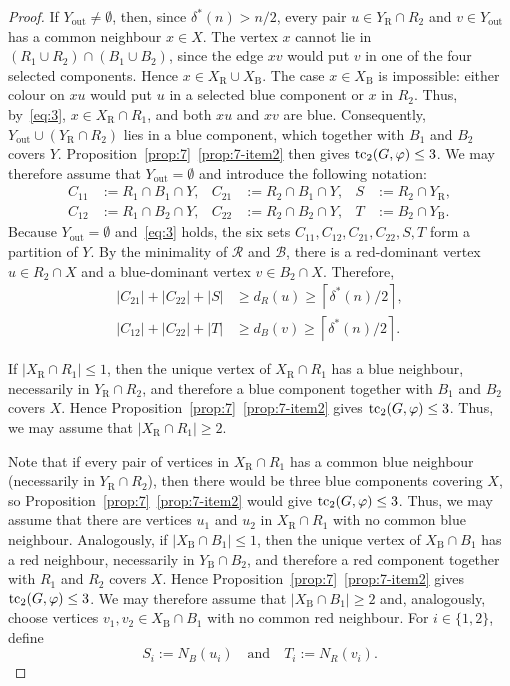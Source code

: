 \documentclass[12pt,reqno,a4paper]{amsart}
\def\tc{\mathop{\text{\rm tc}}\nolimits}
\newcommand{\out}{\mathrm{out}}
\newcommand{\R}{\mathrm{R}}
\newcommand{\B}{\mathrm{B}}
\begin{document}
\begin{proof}
If $Y_{\out}\neq\emptyset$, then, since $\delta^*(n)>n/2$, every pair
$u\in Y_{\R}\cap R_2$ and $v\in Y_{\out}$ has a common neighbour $x\in X$.
The vertex $x$ cannot lie in $(R_1\cup R_2)\cap(B_1\cup B_2)$, since the edge
$xv$ would put $v$ in one of the four selected components. Hence
$x\in X_{\R}\cup X_{\B}$. The case $x\in X_{\B}$ is impossible: either colour
on $xu$ would put $u$ in a selected blue component or $x$ in $R_2$. Thus,
by~\eqref{eq:3}, $x\in X_{\R}\cap R_1$, and both $xu$ and $xv$ are blue.
Consequently, $Y_{\out}\cup(Y_{\R}\cap R_2)$ lies in a blue component, which
together with $B_1$ and $B_2$ covers $Y$. Proposition~\ref{prop:7}~\ref{prop:7-item2}
then gives $\tc_2(G,\varphi)\le3$. We may therefore assume that
$Y_{\out}=\emptyset$ and introduce the following notation:
\[
\begin{aligned}
C_{11}&:=R_1\cap B_1\cap Y, & C_{21}&:=R_2\cap B_1\cap Y,
& S&:=R_2\cap Y_{\R},\\
C_{12}&:=R_1\cap B_2\cap Y, & C_{22}&:=R_2\cap B_2\cap Y,
& T&:=B_2\cap Y_{\B}.
\end{aligned}
\]
Because $Y_{\out}=\emptyset$ and~\eqref{eq:3} holds, the six sets
$C_{11},C_{12},C_{21},C_{22},S,T$ form a partition of $Y$.
By the minimality of $\mathcal R$ and $\mathcal B$, there is a red-dominant
vertex $u\in R_2\cap X$ and a blue-dominant vertex $v\in B_2\cap X$. Therefore,
\begin{align}
|C_{21}|+|C_{22}|+|S|
    &\ge d_R(u)\ge\left\lceil\delta^*(n)/2\right\rceil,
    \label{eq:delta*/2-1}\\
|C_{12}|+|C_{22}|+|T|
    &\ge d_B(v)\ge\left\lceil\delta^*(n)/2\right\rceil.
    \label{eq:delta*/2-2}
\end{align}

If $|X_{\R}\cap R_1|\le 1$, then the unique vertex of $X_{\R}\cap R_1$ has a
blue neighbour, necessarily in $Y_{\R}\cap R_2$, and therefore a blue component
together with $B_1$ and $B_2$ covers $X$. Hence
Proposition~\ref{prop:7}~\ref{prop:7-item2} gives $\tc_2(G,\varphi)\le 3$. Thus, we may
assume that $|X_{\R}\cap R_1| \geq 2$.

Note that if every pair of vertices in $X_{\R}\cap R_1$ has a common blue
neighbour (necessarily in $Y_{\R}\cap R_2$), then there would be three blue
components covering $X$, so Proposition~\ref{prop:7}~\ref{prop:7-item2} would
give $\tc_2(G,\varphi)\le3$. Thus, we may assume that there are vertices
$u_1$ and $u_2$ in $X_{\R} \cap R_1$ with no common blue neighbour. Analogously,
if $|X_{\B}\cap B_1|\le 1$, then the unique vertex of $X_{\B}\cap B_1$ has a red
neighbour, necessarily in $Y_{\B}\cap B_2$, and therefore a red component
together with $R_1$ and $R_2$ covers $X$. Hence
Proposition~\ref{prop:7}~\ref{prop:7-item2} gives $\tc_2(G,\varphi)\le 3$. We may
therefore assume that $|X_{\B}\cap B_1|\ge 2$ and, analogously, choose vertices
$v_1,v_2\in X_{\B}\cap B_1$ with no common red neighbour. For $i\in\{1,2\}$,
define
\begin{equation*}
S_i := N_B(u_i) \quad \text{and} \quad T_i := N_R(v_i).
\end{equation*}


\end{proof}
\end{document}
